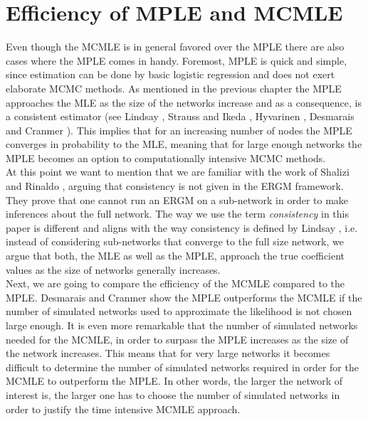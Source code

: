 \documentclass[10pt, conference, compsocconf]{IEEEtran}
\begin{document}
\section{Efficiency of MPLE and MCMLE}
\noindent Even though the MCMLE is in general favored over the MPLE there are also cases where the MPLE comes in handy. Foremost, MPLE is quick and simple, since estimation can be done by basic logistic regression and does not exert elaborate MCMC methods. As mentioned in the previous chapter the MPLE approaches the MLE as the size of the networks increase and as a consequence, is a consistent estimator (see Lindsay \cite{Lindsay1988}, Strauss and Ikeda \cite{StraussIkeda1990}, Hyvarinen \cite{Hyvarinen2006}, Desmarais and Cranmer \cite{Desmarais.2012}). This implies that for an increasing number of nodes the MPLE converges in probability to the MLE, meaning that for large enough networks the MPLE becomes an option to computationally intensive MCMC methods.\\[0.3cm]
At this point we want to mention that we are familiar with the work of Shalizi and Rinaldo \cite{shalizi2013}, arguing that consistency is not given in the ERGM framework. They prove that one cannot run an ERGM on a sub-network in order to make inferences about the full network. 
The way we use the term \textit{consistency} in this paper is different and aligns with the way consistency is defined by Lindsay \cite{Lindsay1988}, i.e. instead of considering sub-networks that converge to the full size network, we argue that both, the MLE as well as the MPLE, approach the true coefficient values as the size of networks generally increases. \\[0.3cm]%
Next, we are going to compare the efficiency of the MCMLE compared to the MPLE. Desmarais and Cranmer \cite{Desmarais.2012} show the MPLE outperforms the MCMLE if the number of simulated networks used to approximate the likelihood is not chosen large enough. It is even more remarkable that the number of simulated networks needed for the MCMLE, in order to surpass the MPLE increases as the size of the network increases. This means that for very large networks it becomes difficult to determine the number of simulated networks required in order for the MCMLE to outperform the MPLE. In other words, the larger the network of interest is, the larger one has to choose the number of simulated networks in order to justify the time intensive MCMLE approach.\\[0.3cm]
\end{document}
